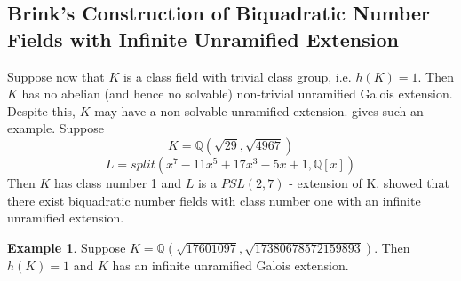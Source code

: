 \documentclass[12pt]{extarticle}
\newcommand{\Q}{\mathbb{Q}}
\newcommand{\<}{\langle}
\renewcommand{\>}{\rangle}
\theoremstyle{definition}
\newtheorem*{example}{Example}
\begin{document}
\subsection{Brink's Construction of Biquadratic Number Fields with Infinite Unramified Extension}

Suppose now that $K$ is a class field with trivial class group, i.e. $h(K)=1$. Then $K$ has no abelian (and hence no
solvable) non-trivial unramified Galois extension. Despite this, $K$ may have a non-solvable unramified extension. \cite{BRINK} gives such an example. Suppose
\begin{equation}
   K=\Q(\sqrt{29},\sqrt{4967}) 
\end{equation}
\begin{equation}
   L=split(x^7 - 11x^5 + 17x^3 - 5x + 1,\Q[x])
\end{equation}
Then $K$ has class number 1 and $L$ is a $PSL(2, 7)$ - extension of K.
\cite{MAIR} showed that there exist biquadratic number fields with class number one with an infinite unramified extension. 
\begin{example}
Suppose $K= \Q( \sqrt{17601097}, \sqrt{17380678572159893})$. Then $h(K)=1$ and $K$ has an infinite unramified Galois extension. 
\end{example}
\end{document}
